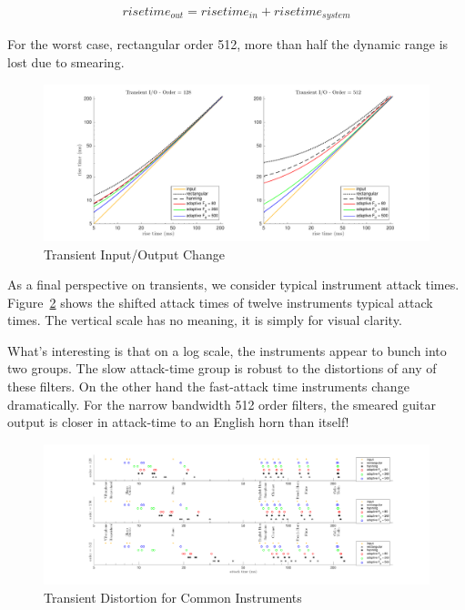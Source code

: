 \documentclass [11pt, proquest,oneside] {ganter_thesis}[2015/03/03]
\begin{document}
\begin{align}
risetime_{out} = risetime_{in} + risetime_{system}
\end{align}

For the worst case, rectangular order 512, more than half the dynamic range is lost due to smearing.

\begin{figure}[!ht]
  \centering
    \includegraphics[width=1\textwidth]{transient_2}
    \caption{Transient Input/Output Change}\label{fig:transient_2}
\end{figure}

As a final perspective on transients, we consider typical instrument attack times.  Figure~\ref{fig:transient_3} shows the shifted attack times of twelve instruments typical attack times.  The vertical scale has no meaning, it is simply for visual clarity.

What's interesting is that on a log scale, the instruments appear to bunch into two groups.  The slow attack-time group is robust to the distortions of any of these filters.  On the other hand the fast-attack time instruments change dramatically.  For the narrow bandwidth 512 order filters, the smeared guitar output is closer in attack-time to an English horn than itself!

\begin{figure}[!ht]
  \centering
    \includegraphics[width=1.2\textwidth]{transient_3}
    \caption{Transient Distortion for Common Instruments}\label{fig:transient_3}
\end{figure}
\end{document}
